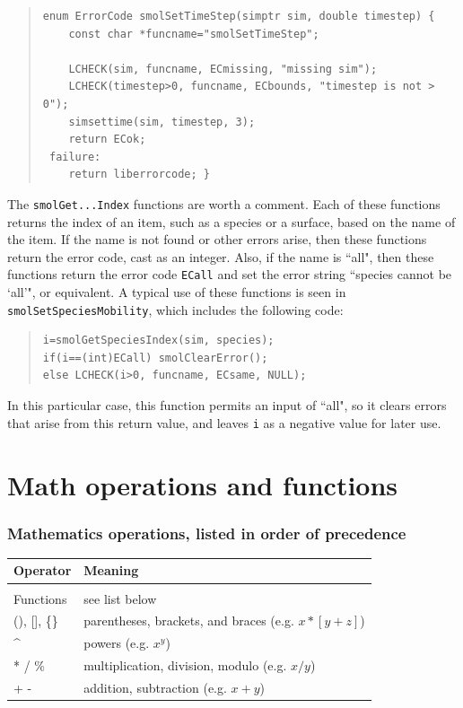 \documentclass {book}
\newcommand {\ttt} {\texttt}
\begin{document}
\begin{quote}
\begin{lstlisting}[style=SSAC]
enum ErrorCode smolSetTimeStep(simptr sim, double timestep) {
	const char *funcname="smolSetTimeStep";

	LCHECK(sim, funcname, ECmissing, "missing sim");
	LCHECK(timestep>0, funcname, ECbounds, "timestep is not > 0");
	simsettime(sim, timestep, 3);
	return ECok;
 failure:
	return liberrorcode; }
\end{lstlisting}
\end{quote}

The \ttt{smolGet...Index} functions are worth a comment. Each of these functions returns the index of an item, such as a species or a surface, based on the name of the item. If the name is not found or other errors arise, then these functions return the error code, cast as an integer. Also, if the name is ``all", then these functions return the error code \ttt{ECall} and set the error string ``species cannot be `all'", or equivalent. A typical use of these functions is seen in \ttt{smolSetSpeciesMobility}, which includes the following code:

\begin{quote}
\begin{lstlisting}[style=SSAC]
i=smolGetSpeciesIndex(sim, species);
if(i==(int)ECall) smolClearError();
else LCHECK(i>0, funcname, ECsame, NULL);
\end{lstlisting}
\end{quote}

In this particular case, this function permits an input of ``all", so it clears errors that arise from this return value, and leaves \ttt{i} as a negative value for later use.


\chapter{Math operations and functions}

\subsection*{Mathematics operations, listed in order of precedence}

\begin{longtable}[c]{ll}
Operator & Meaning\\
\hline \\
Functions & see list below\\
(), [], \{\} & parentheses, brackets, and braces (e.g. $x*[y+z]$)\\
\^{} & powers (e.g. $x^y$)\\
* / \% & multiplication, division, modulo (e.g. $x/y$)\\
+ - & addition, subtraction (e.g. $x+y$)
\end{longtable}
\end{document}
